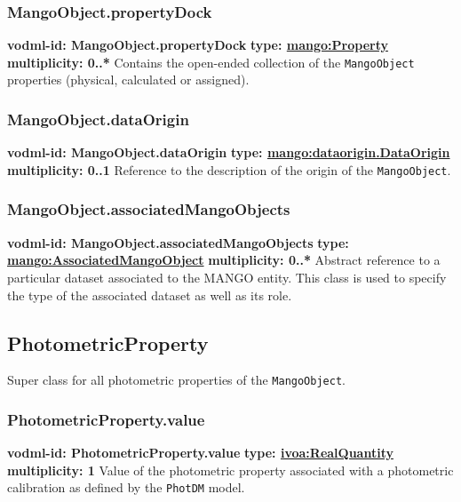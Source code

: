     \subsubsection{MangoObject.propertyDock}
      \textbf{vodml-id: MangoObject.propertyDock} \newline
      \textbf{type: \hyperref[sect:Property]{mango:Property}} \newline
      \textbf{multiplicity: 0..*} \newline
      Contains the open-ended collection of the \texttt{MangoObject} properties (physical, calculated or assigned).

    \subsubsection{MangoObject.dataOrigin}
      \textbf{vodml-id: MangoObject.dataOrigin} \newline
      \textbf{type: \hyperref[sect:dataorigin.DataOrigin]{mango:dataorigin.DataOrigin}} \newline
      \textbf{multiplicity: 0..1} \newline
      Reference to the description of the origin of the \texttt{MangoObject}.

    \subsubsection{MangoObject.associatedMangoObjects}
      \textbf{vodml-id: MangoObject.associatedMangoObjects} \newline
      \textbf{type: \hyperref[sect:AssociatedMangoObject]{mango:AssociatedMangoObject}} \newline
      \textbf{multiplicity: 0..*} \newline
      Abstract reference to a particular dataset associated to the MANGO entity. This class is used to specify the type of the associated dataset as well as its role.

  \subsection{PhotometricProperty}
  \label{sect:PhotometricProperty}
    Super class for all photometric properties of the \texttt{MangoObject}.

    \subsubsection{PhotometricProperty.value}
      \textbf{vodml-id: PhotometricProperty.value} \newline
      \textbf{type: \hyperref[sect:ivoa]{ivoa:RealQuantity}} \newline
      \textbf{multiplicity: 1} \newline
      Value of the photometric property associated with a photometric calibration as defined by the \texttt{PhotDM} model.


